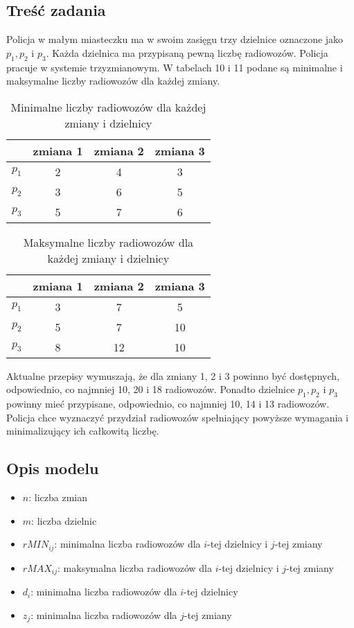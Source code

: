 \documentclass{article}
\begin{document}
\subsection{Treść zadania}
Policja w małym miasteczku ma w swoim zasięgu trzy dzielnice oznaczone jako $p_1, p_2$ i $p_3$. Każda dzielnica ma przypisaną pewną liczbę radiowozów. Policja pracuje w systemie trzyzmianowym. W tabelach 10 i 11 podane są minimalne i maksymalne liczby radiowozów dla każdej zmiany.
\begin{table}[H]
    \centering
    \begin{tabular}{cccc}
        \hline
        \textbf{ } & \textbf{zmiana 1} & \textbf{zmiana 2} & \textbf{zmiana 3} \\
        \hline
        $p_1$ & 2 & 4 & 3 \\
        \hline
        $p_2$ & 3 & 6 & 5 \\
        \hline
        $p_3$ & 5 & 7 & 6 \\
        \hline
    \end{tabular}
    \caption{Minimalne liczby radiowozów dla każdej zmiany i dzielnicy}
\end{table}
\begin{table}[H]
    \centering
    \begin{tabular}{cccc}
        \hline
        \textbf{ } & \textbf{zmiana 1} & \textbf{zmiana 2} & \textbf{zmiana 3} \\
        \hline
        $p_1$ & 3 & 7 & 5 \\
        \hline
        $p_2$ & 5 & 7 & 10 \\
        \hline
        $p_3$ & 8 & 12 & 10 \\
        \hline
    \end{tabular}
    \caption{Maksymalne liczby radiowozów dla każdej zmiany i dzielnicy}
\end{table}
Aktualne przepisy wymuszają, że dla zmiany 1, 2 i 3 powinno być dostępnych, odpowiednio, co najmniej 10, 20 i 18 radiowozów. Ponadto dzielnice $p_1, p_2$ i $p_3$ powinny mieć przypisane, odpowiednio, co
najmniej 10, 14 i 13 radiowozów. Policja chce wyznaczyć przydział radiowozów spełniający powyższe wymagania i minimalizujący ich całkowitą liczbę. 
\subsection{Opis modelu}
\begin{itemize}
    \item $n$: liczba zmian
    \item $m$: liczba dzielnic
    \item $rMIN_{ij}$: minimalna liczba radiowozów dla $i$-tej dzielnicy i $j$-tej zmiany
    \item $rMAX_{ij}$: maksymalna liczba radiowozów dla $i$-tej dzielnicy i $j$-tej zmiany
    \item $d_i$: minimalna liczba radiowozów dla $i$-tej dzielnicy
    \item $z_j$: minimalna liczba radiowozów dla $j$-tej zmiany
\end{itemize}
\end{document}
